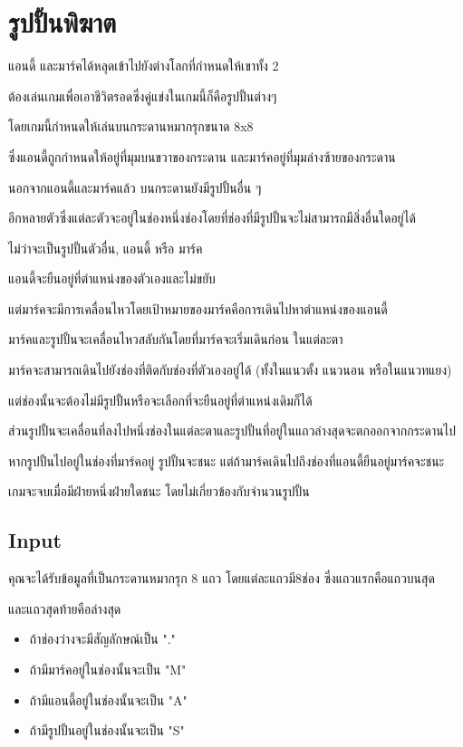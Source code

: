 \documentclass{article}
\begin{document}
\section*{รูปปั้นพิฆาต}

แอนดี้ และมาร์คได้หลุดเข้าไปยังต่างโลกที่กำหนดให้เขาทั้ง 2

ต้องเล่นเกมเพื่อเอาชีวิตรอดซึ่งคู่แข่งในเกมนี้ก็คือรูปปั้นต่างๆ

โดยเกมนี้กำหนดให้เล่นบนกระดานหมากรุกขนาด 8x8

ซึ่งแอนดี้ถูกกำหนดให้อยู่ที่มุมบนขวาของกระดาน และมาร์คอยู่ที่มุมล่างซ้ายของกระดาน

นอกจากแอนดี้และมาร์คแล้ว บนกระดานยังมีรูปปั้นอื่น ๆ

อีกหลายตัวซึ่งแต่ละตัวจะอยู่ในช่องหนึ่งช่องโดยที่ช่องที่มีรูปปั้นจะไม่สามารถมีสิ่งอื่นใดอยู่ได้

ไม่ว่าจะเป็นรูปปั้นตัวอื่น, แอนดี้ หรือ มาร์ค



แอนดี้จะยืนอยู่ที่ตำแหน่งของตัวเองและไม่ขยับ

แต่มาร์คจะมีการเคลื่อนไหวโดยเป้าหมายของมาร์คคือการเดินไปหาตำแหน่งของแอนดี้

มาร์คและรูปปั้นจะเคลื่อนไหวสลับกันโดยที่มาร์คจะเริ่มเดินก่อน ในแต่ละตา

มาร์คจะสามารถเดินไปยังช่องที่ติดกับช่องที่ตัวเองอยู่ได้ (ทั้งในแนวตั้ง แนวนอน หรือในแนวทแยง)

แต่ช่องนั้นจะต้องไม่มีรูปปั้นหรือจะเลือกที่จะยืนอยู่ที่ตำแหน่งเดิมก็ได้

ส่วนรูปปั้นจะเคลื่อนที่ลงไปหนึ่งช่องในแต่ละตาและรูปปั้นที่อยู่ในแถวล่างสุดจะตกออกจากกระดานไป



หากรูปปั้นไปอยู่ในช่องที่มาร์คอยู่ รูปปั้นจะชนะ แต่ถ้ามาร์คเดินไปถึงช่องที่แอนดี้ยืนอยู่มาร์คจะชนะ

เกมจะจบเมื่อมีฝ่ายหนึ่งฝ่ายใดชนะ โดยไม่เกี่ยวข้องกับจำนวนรูปปั้น



\subsection*{Input}
คุณจะได้รับข้อมูลที่เป็นกระดานหมากรุก 8 แถว โดยแต่ละแถวมี8ช่อง ซึ่งแถวแรกคือแถวบนสุด

และแถวสุดท้ายคือล่างสุด



\begin{itemize}

\tightlist

\item

  ถ้าช่องว่างจะมีสัญลักษณ์เป็น "."

\item

  ถ้ามีมาร์คอยู่ในช่องนั้นจะเป็น "M"

\item

  ถ้ามีแอนดี้อยู่ในช่องนั้นจะเป็น "A"

\item

  ถ้ามีรูปปั้นอยู่ในช่องนั้นจะเป็น "S"

\end{itemize}
\end{document}
